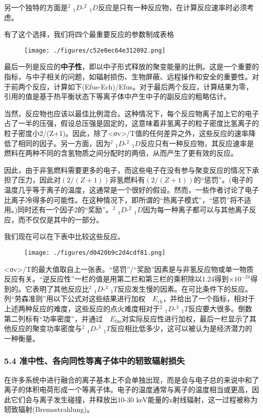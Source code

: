 另一个独特的方面是$^{2}$ $_{1}D$-$^{2}$ $_{1}D$反应是只有一种反应物，在计算反应速率时必须考虑。

有了这个选择，我们将四个最重要反应的参数制成表格
\begin{figure}[ht]
\centering
\texttt{[image: ./figures/c52e0ec64e312092.png]}
\caption\label{fig_HJB_9}
\end{figure}
最后一列是反应的\textbf{中子性}，即以中子形式释放的聚变能量的比例。这是一个重要的指标，与中子相关的问题，如辐射损伤、生物屏蔽、远程操作和安全的重要性。对于前两个反应，计算如下(Efus-Ech)/Efus。对于最后两个反应，计算结果为零，引用的值是基于热平衡状态下等离子体中产生中子的副反应的粗略估计。

当然，反应物也应该以最佳比例混合。这种情况下，每个反应物离子加上它的电子占了一半的压强，假设总压强是固定的，这意味着非氢离子的粒子密度比氢离子的粒子密度小2/(Z+1)。因此，除了<σv>/T值的任何差异之外，这些反应的速率降低了相同的因子。另一方面，因为$^{2}$ $_{1}D$-$^{2}$ $_{1}D$反应只有一种反应物，其反应速率是燃料在两种不同的含氢物质之间分配时的两倍，从而产生了更有效的反应。

因此，由于非氢燃料需要更多的电子，而这些电子在没有参与聚变反应的情况下承担了压力，因此对$(2/(Z+1))$非氢燃料有$(2/(Z+1))$的“惩罚”。(电子的温度几乎等于离子的温度，这通常是一个很好的假设。然而，一些作者讨论了电子比离子冷得多的可能性。在这种情况下，即所谓的“热离子模式”，“惩罚”将不适用。)同时还有一个因子2的“奖励”。$^{2}$ $_{1}D$-$^{2}$ $_{1}D$因为每一种离子都可以与其他离子反应，而不仅仅是其中的一部分。

我们现在可以在下表中比较这些反应。
\begin{figure}[ht]
\centering
\texttt{[image: ./figures/d0420b9c2d4cdf81.png]}
\caption \label{fig_HJB_10}
\end{figure}
<σv>/T的最大值取自上一张表。“惩罚”/“奖励”因素是与非氢反应物或单一物质反应有关。“逆反应性”一栏的值是用第二栏和第三栏的乘积除以1.24得到$\times10^{-24}$得到的。它表明了其他反应比$^{2}$ $_{1}D$-$^{3}$ $_{1}T$反应发生慢的因素。在可比条件下的反应。列“劳森准则”用以下公式对这些结果进行加权$\quad E_{\text{ch}}$，并给出了一个指标，相对于上述两种反应的难度，这些反应的点火难度相对于$^{2}$ $_{1}D$-$^{3}$ $_{1}T$反应要大很多。倒数第二列标有“功率密度”，并通过$\quad E_{\text{fus}}$对实际反应性进行加权，最后一栏显示了其他反应的聚变功率密度与$^{2}$ $_{1}D$-$^{3}$ $_{1}T$反应相比低多少，这可以被认为是经济潜力的一种衡量。
\subsubsection{5.4 准中性、各向同性等离子体中的轫致辐射损失}
在许多系统中进行融合的离子基本上不会单独出现，而是会与电子总的来说中和了离子的体积电荷形成一个等离子体。电子的温度通常与离子的温度相当或更高，因此它们会与离子发生碰撞，并释放出10-30 keV能量的x射线辐射，这一过程被称为轫致辐射(Bremsstrahlung)。

